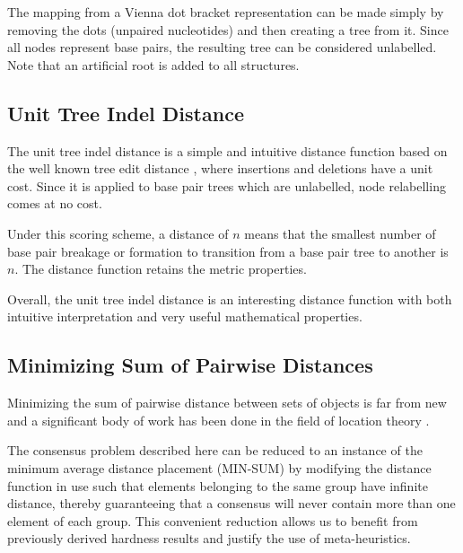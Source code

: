 \documentclass[10pt,letterpaper]{article}
\begin{document}
\noindent The mapping from a Vienna dot bracket representation can be made simply by removing the dots (unpaired nucleotides) and then creating a tree from it. Since all nodes represent base pairs, the resulting tree can be considered unlabelled. Note that an artificial root is added to all structures. 

\subsection*{Unit Tree Indel Distance}

The unit tree indel distance is a simple and intuitive distance function based on the well known tree edit distance \cite{tai, zhang_shasha}, where insertions and deletions have a unit cost.
Since it is applied to base pair trees which are unlabelled, node relabelling comes at no cost.

\noindent Under this scoring scheme, a distance of $n$ means that the smallest number of base pair breakage or formation to transition from a base pair tree to another is $n$. The distance function retains the metric properties.

\noindent Overall, the unit tree indel distance is an interesting distance function with both intuitive interpretation and very useful mathematical properties.



\subsection*{Minimizing Sum of Pairwise Distances}





Minimizing the sum of pairwise distance between sets of objects is far from new and a significant body of work has been done in the field of location theory \cite{compact_location}. \newline


\noindent The consensus problem described here can be reduced to an instance of the minimum average distance placement (MIN-SUM) by modifying the distance function in use such that elements belonging to the same group have infinite distance, thereby guaranteeing that a consensus will never contain more than one element of each group. This convenient reduction allows us to benefit from previously derived hardness results and justify the use of meta-heuristics.
\end{document}
